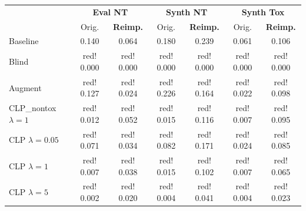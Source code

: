 \documentclass[20pt,margin=1in,innermargin=-4.5in,blockverticalspace=-0.25in]{tikzposter}
\def\cca#1{%
    \pgfmathsetmacro\calc{(#1)*100/(0.176)}%
    \edef\clrmacro{\noexpand\cellcolor{red!\calc}}%
    \clrmacro%
    \ifdim \calc pt>1000pt\color{white}\fi{#1}%
}
\def\ccb#1{%
    \pgfmathsetmacro\calc{(#1)*100/(0.081)}%
    \edef\clrmacro{\noexpand\cellcolor{red!\calc}}%
    \clrmacro%
    \ifdim \calc pt>1000pt\color{white}\fi{#1}%
}
\def\ccc#1{%
    \pgfmathsetmacro\calc{(#1)*100/(0.226)}%
    \edef\clrmacro{\noexpand\cellcolor{red!\calc}}%
    \clrmacro%
    \ifdim \calc pt>1000pt\color{white}\fi{#1}%
}
\def\ccd#1{%
    \pgfmathsetmacro\calc{(#1)*100/(0.301)}%
    \edef\clrmacro{\noexpand\cellcolor{red!\calc}}%
    \clrmacro%
    \ifdim \calc pt>1000pt\color{white}\fi{#1}%
}
\def\cce#1{%
    \pgfmathsetmacro\calc{(#1)*100/(0.076)}%
    \edef\clrmacro{\noexpand\cellcolor{red!\calc}}%
    \clrmacro%
    \ifdim \calc pt>1000pt\color{white}\fi{#1}%
}
\def\ccf#1{%
    \pgfmathsetmacro\calc{(#1)*100/(0.133)}%
    \edef\clrmacro{\noexpand\cellcolor{red!\calc}}%
    \clrmacro%
    \ifdim \calc pt>1000pt\color{white}\fi{#1}%
}
\begin{document}
\begin{columns}
{\begin{center}
\begin{tabular}{|l|cc|cc|cc|}
                \cline{2-7}
                \multicolumn{1}{c|}{} & \multicolumn{2}{c|}{\textbf{Eval NT}} & \multicolumn{2}{c|}{\textbf{Synth NT}} & \multicolumn{2}{c|}{\textbf{Synth Tox}}\\
                \multicolumn{1}{c|}{} & Orig. & \textbf{Reimp.} & Orig. & \textbf{Reimp.} & Orig. & \textbf{Reimp.} \\
                \hline
                Baseline & \cca{0.140} & \ccb{0.064} & \ccc{0.180}  & \ccd{0.239} & \cce{0.061} & \ccf{0.106}\\
                \hline
                Blind& \cca{0.000} & \ccb{0.000}& \ccc{0.000}  & \ccd{0.000} & \cce{0.000} & \ccf{0.000}\\
                \hline
                Augment & \cca{0.127} & \ccb{0.024} & \ccc{0.226}  & \ccd{0.164} & \cce{0.022} & \ccf{0.098}\\
                \hline
                CLP\_nontox $\lambda=1$ & \cca{0.012} & \ccb{0.052} & \ccc{0.015}  & \ccd{0.116} & \cce{0.007} & \ccf{0.095}\\
                \hline
                CLP $\lambda=0.05$ & \cca{0.071} & \ccb{0.034} & \ccc{0.082}  & \ccd{0.171} & \cce{0.024} & \ccf{0.085}\\
                \hline
                CLP $\lambda=1$ & \cca{0.007} & \ccb{0.038} & \ccc{0.015}  & \ccd{0.102} & \cce{0.007} & \ccf{0.065}\\
                \hline
                CLP $\lambda=5$ & \cca{0.002} & \ccb{0.020} & \ccc{0.004}  & \ccd{0.041} & \cce{0.004} & \ccf{0.023}\\
                \hline
            \end{tabular}
        \end{center}

   
        
    }

\end{columns}
\end{document}
